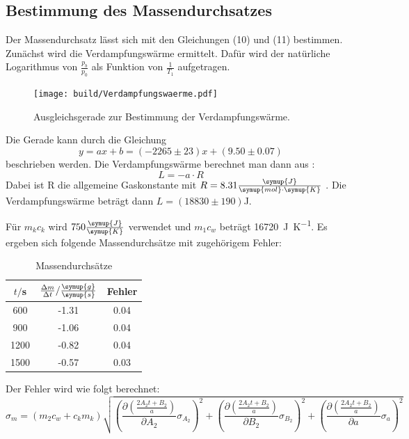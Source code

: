 \subsection{Bestimmung des Massendurchsatzes}
Der Massendurchsatz lässt sich mit den Gleichungen (10) und (11) bestimmen. Zunächst
wird die Verdampfungswärme ermittelt. Dafür wird der natürliche Logarithmus von
$\frac{p_b}{p_0}$ als Funktion von $\frac{1}{T_1}$ aufgetragen.
\begin{figure}[H]
  \centering
  \texttt{[image: build/Verdampfungswaerme.pdf]}
  \caption{Ausgleichsgerade zur Bestimmung der Verdampfungswärme.}
  \label{fig:Verdampfungswaerme}
\end{figure}
Die Gerade kann durch die Gleichung
\begin{equation}
  y = ax + b = (-2265 \pm 23)x + (9.50 \pm 0.07)
\end{equation}
beschrieben werden.
Die Verdampfungswärme berechnet man dann aus \cite{sample2}:
\begin{equation}
  L = -a \cdot R
\end{equation}
Dabei ist R die allgemeine Gaskonstante mit $R = 8.31 \frac{\symup{J}}{\symup{mol} \cdot \symup{K}}$ \cite{sample3}.
Die Verdampfungswärme beträgt dann $L = (18830 \pm 190)$J.

Für $m_kc_k$ wird $750 \frac{\symup{J}}{\symup{K}}$ verwendet und $m_1c_w$ beträgt \SI{16720}{\joule\per\kelvin}.
Es ergeben sich folgende Massendurchsätze mit zugehörigem Fehler:
\begin{table}[H]
  \centering
  \caption{Massendurchsätze}
  \label{tab:Massendurchsätze}
  \begin{tabular}{c c c}
    \toprule
    $t/$s &$\frac{\Delta m}{\Delta t}/\frac{\symup{g}}{\symup{s}}$ & Fehler \\
    \midrule
      600 & -1.31 & 0.04 \\
      900 & -1.06 & 0.04 \\
     1200 & -0.82 & 0.04 \\
     1500 & -0.57 & 0.03 \\
    \bottomrule
  \end{tabular}
\end{table}

Der Fehler wird wie folgt berechnet:
\begin{equation}
  \sigma_m = (m_2c_w + c_km_k)\sqrt{
      \left( \frac{\partial \left(\frac{2A_2t + B_2}{a}\right)}{\partial A_2} \sigma_{A_2} \right)^{\!\! 2} +
      \left( \frac{\partial \left(\frac{2A_2t + B_2}{a}\right)}{\partial B_2} \sigma_{B_2} \right)^{\!\! 2} +
      \left( \frac{\partial \left(\frac{2A_2t + B_2}{a}\right)}{\partial a} \sigma_{a} \right)^{\!\! 2}
    }
\end{equation}

